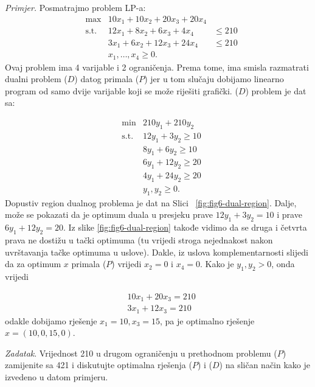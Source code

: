 \documentclass[a4paper, utf8, 11pt, colorlinks]{article}
\begin{document}
\emph{Primjer.} Posmatrajmo problem LP-a:
$$\begin{array}{cccc}
   &\max                     &10 x_1 + 10 x_2 + 20 x_3 + 20 x_4  & \\
   &\mbox{s.t. }      &12 x_1 + 8 x_2  + 6 x_3  + 4 x_4   & \leq 210 \\
    &                        &3 x_1 + 6 x_2   + 12 x_3 + 24 x_4 & \leq 210 \\
     &                       & x_1,\ldots, x_4 \geq 0.                                 &
\end{array}
$$
Ovaj problem ima 4 varijable i 2 ograničenja. Prema tome, ima smisla razmatrati dualni problem  ($D$)  datog primala  ($P$)  jer u tom slučaju dobijamo linearno program od samo dvije varijable koji se može riješiti grafički.  ($D$)  problem je dat sa:

$$\begin{array}{ccc}
    &\min                    &  210 y_1 + 210 y_2      \\
    &\mbox{s.t. }     &  12 y_1  + 3   y_2 \geq 10 \\
    &                        &  8  y_1 + 6    y_2 \geq 10 \\
    &                        &  6 y_1 + 12 y_2  \geq 20 \\
    &                        &  4 y_1 + 24 y_2  \geq 20 \\
    &                        &  y_1, y_2 \geq 0.
\end{array}$$
Dopustiv region dualnog problema je dat na Slici~ \ref{fig:fig6-dual-region}. %
Dalje, može se pokazati da je optimum duala u presjeku prave $12 y_1 + 3 y_2 = 10$ i prave $6y_1 + 12 y_2 = 20$. Iz slike \ref{fig:fig6-dual-region} takođe vidimo da se druga i četvrta prava ne dostižu u tački optimuma (tu vrijedi stroga nejednakost nakon uvrštavanja tačke optimuma u uslove). Dakle, iz uslova komplementarnosti slijedi da za optimum $x$ primala  ($P$)  vrijedi $x_2 = 0$ i $x_4 = 0$.  Kako je $y_1, y_2 > 0$, onda vrijedi 

\begin{align}
    &10 x_1 + 20 x_3 = 210 \nonumber \\
    & 3x_1 + 12 x_3  = 210 \nonumber
\end{align}
odakle dobijamo rješenje $x_1 = 10, x_3 = 15$, pa je optimalno rješenje $x = (10, 0, 15, 0)$.

\emph{Zadatak}. Vrijednost 210 u drugom ograničenju u prethodnom problemu  ($P$)  zamijenite sa 421 i diskutujte optimalna rješenja  ($P$)  i  ($D$)  na sličan način kako je izvedeno  u datom primjeru.
\end{document}
